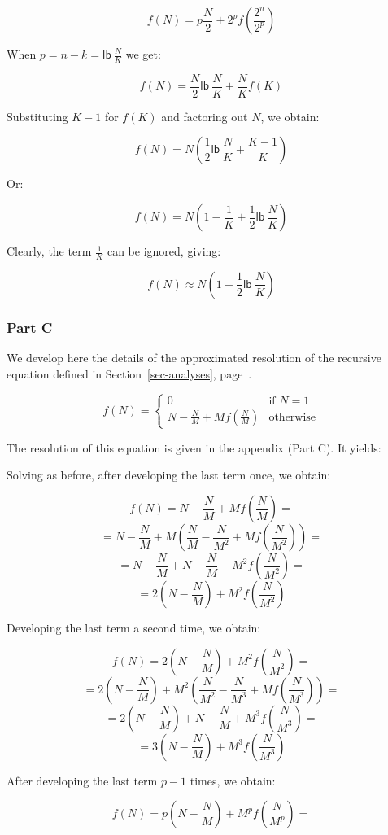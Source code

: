 \[ f(N) = p\frac{N}{2} + 2^pf(\frac{2^n}{2^p})\]

When $p = n - k = \mathsf{lb}~\frac{N}{K}$ we get:

\[ f(N) = \frac{N}{2}\mathsf{lb}~\frac{N}{K} + \frac{N}{K}f(K)\]

Substituting $K-1$ for $f(K)$ and factoring out $N$, we obtain:

\[ f(N) = N(\frac{1}{2}\mathsf{lb}~\frac{N}{K} + \frac{K - 1}{K})\]

Or:

\[ f(N) = N(1 - \frac{1}{K} + \frac{1}{2}\mathsf{lb}~\frac{N}{K})\]

Clearly, the term $\frac{1}{K}$ can be ignored, giving:

\[ f(N) \approx N(1 + \frac{1}{2}\mathsf{lb}~\frac{N}{K})\]

\subsubsection*{Part C}
We develop here the details of the approximated resolution
of the recursive equation defined in Section~\ref{sec-analyses},
page~\pageref{analyse3}.

\[ f(N) = \left\{ \begin{array}{ll}
                    0 & \mbox{if $N = 1$} \\
                    N - \frac{N}{M} + Mf(\frac{N}{M}) &\mbox{otherwise}
                  \end{array} \right. \]

The resolution of this equation is given in the appendix (Part C).
It yields:

Solving as before, after developing the last term once, we obtain:

\[ f(N) = N - \frac{N}{M} + Mf(\frac{N}{M}) = \]
\[ = N - \frac{N}{M} + M(\frac{N}{M} - \frac{N}{M^2} + Mf(\frac{N}{M^2})) = \]
\[ = N - \frac{N}{M} + N - \frac{N}{M} + M^2f(\frac{N}{M^2}) = \]
\[ = 2(N - \frac{N}{M}) + M^2f(\frac{N}{M^2}) \]

Developing the last term a second time, we obtain:

\[ f(N) = 2(N - \frac{N}{M}) + M^2f(\frac{N}{M^2}) = \]
\[ = 2(N - \frac{N}{M}) + M^2(\frac{N}{M^2} - \frac{N}{M^3} + Mf(\frac{N}{M^3})) = \]
\[ = 2(N - \frac{N}{M}) + N - \frac{N}{M} + M^3f(\frac{N}{M^3}) = \]
\[ = 3(N - \frac{N}{M}) + M^3f(\frac{N}{M^3}) \]

After developing the last term $p-1$ times, we obtain:

\[ f(N) = p(N - \frac{N}{M}) + M^pf(\frac{N}{M^p}) = \]

